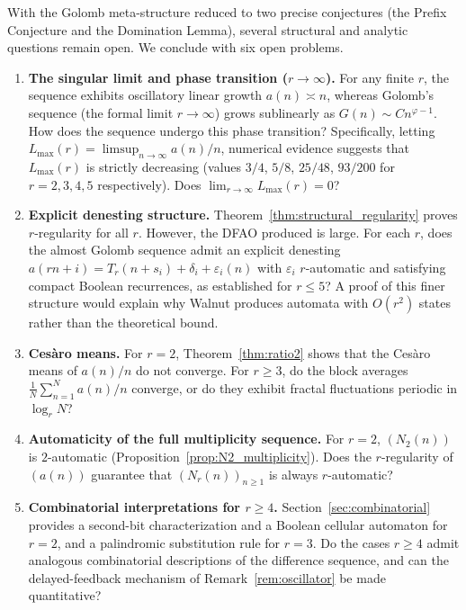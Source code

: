\documentclass[12pt]{article}
\theoremstyle{definition}
\theoremstyle{remark}
\begin{document}
With the Golomb meta-structure reduced to two precise conjectures (the Prefix Conjecture and the Domination Lemma), several structural and analytic questions remain open. We conclude with six open problems.

\begin{enumerate}
  \item \textbf{The singular limit and phase transition ($r \to \infty$).}
        For any finite $r$, the sequence exhibits oscillatory linear growth
        $a(n) \asymp n$, whereas Golomb's sequence (the formal limit $r\to\infty$)
        grows sublinearly as $G(n) \sim C n^{\varphi-1}$.
        How does the sequence undergo this phase transition?
        Specifically, letting $L_{\max}(r) = \limsup_{n\to\infty} a(n)/n$, numerical
        evidence suggests that $L_{\max}(r)$ is strictly decreasing
        (values $3/4$, $5/8$, $25/48$, $93/200$ for $r=2,3,4,5$ respectively).
        Does $\lim_{r\to\infty} L_{\max}(r) = 0$?

  \item \textbf{Explicit denesting structure.}
        Theorem~\ref{thm:structural_regularity} proves $r$-regularity for all $r$.
        However, the DFAO produced is large. For each $r$, does the almost Golomb
        sequence admit an explicit denesting $a(rn+i)=T_r(n+s_i)+\delta_i+\varepsilon_i(n)$
        with $\varepsilon_i$ $r$-automatic and satisfying compact Boolean recurrences,
        as established for $r\le 5$? A proof of this finer structure would explain why
        Walnut produces automata with $O(r^2)$ states rather than the theoretical bound.

  \item \textbf{Ces\`aro means.}
        For $r=2$, Theorem~\ref{thm:ratio2} shows that the Ces\`aro means of
        $a(n)/n$ do not converge. For $r \ge 3$, do the block averages
        $\frac{1}{N}\sum_{n=1}^N a(n)/n$ converge, or do they exhibit
        fractal fluctuations periodic in $\log_r N$?

  \item \textbf{Automaticity of the full multiplicity sequence.}
        For $r=2$, $(N_2(n))$ is $2$-automatic
        (Proposition~\ref{prop:N2_multiplicity}). Does the $r$-regularity
        of $(a(n))$ guarantee that $(N_r(n))_{n\ge 1}$ is always $r$-automatic?

  \item \textbf{Combinatorial interpretations for $r\ge 4$.}
        Section~\ref{sec:combinatorial} provides a second-bit characterization
        and a Boolean cellular automaton for $r=2$, and a palindromic substitution
        rule for $r=3$. Do the cases $r\ge 4$ admit analogous combinatorial
        descriptions of the difference sequence, and can the delayed-feedback
        mechanism of Remark~\ref{rem:oscillator} be made quantitative?


\end{enumerate}
\end{document}
